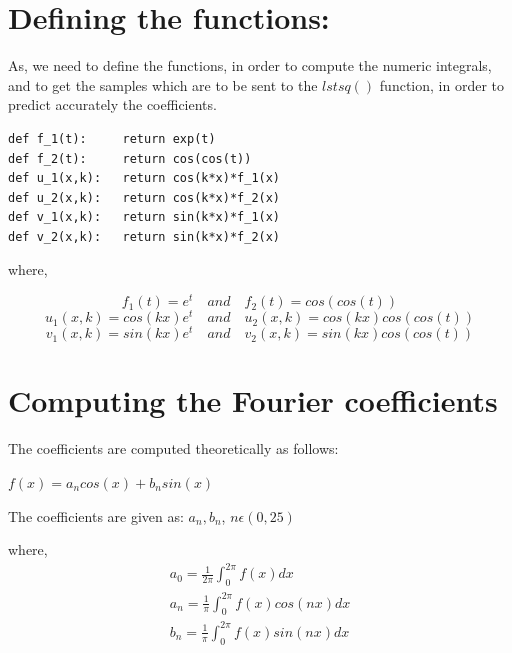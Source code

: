 \documentclass[10pt,english, openany]{book}
\begin{document}
\section{Defining the functions:}
As, we need to define the functions, in order to compute the numeric integrals, and to get the samples which are to be sent to the $lstsq()$ function, in order to predict accurately the coefficients.
\begin{verbatim}
def f_1(t):		return exp(t)
def f_2(t):		return cos(cos(t))
def u_1(x,k):	return cos(k*x)*f_1(x)
def u_2(x,k):	return cos(k*x)*f_2(x)
def v_1(x,k):	return sin(k*x)*f_1(x)
def v_2(x,k):	return sin(k*x)*f_2(x)
\end{verbatim}
where, \par
\begin{equation*}
f_1(t)=e^t
   \quad\text{$and$}\quad 
f_2(t)=cos(cos(t))
\end{equation*}
\begin{equation*}
u_1(x,k)=cos(kx)e^t
   \quad\text{$and$}\quad 
u_2(x,k)=cos(kx)cos(cos(t))
\end{equation*}
\begin{equation*}
v_1(x,k)=sin(kx)e^t
   \quad\text{$and$}\quad 
v_2(x,k)=sin(kx)cos(cos(t))
\end{equation*}

\par
\begingroup

\section{Computing the Fourier coefficients}
The coefficients are computed theoretically as follows: \par
\begin{center}
\centering$f(x)=a_ncos(x)+b_nsin(x)$
\end{center}
The coefficients are given as: {$a_n,b_n$}, $n\epsilon(0,25)$\par
    where,
   \begin{gather*}
   a_0 = \frac{1}{2\pi} \int_{0}^{2\pi} f(x)dx\\
   a_n = \frac{1}{\pi} \int_{0}^{2\pi} f(x)cos(nx)dx\\
    b_n = \frac{1}{\pi} \int_{0}^{2\pi} f(x)sin(nx)dx
    \end{gather*}
    
\end{document}
